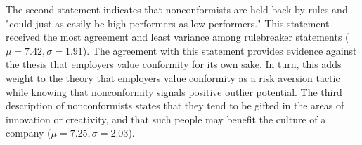 \documentclass[review]{elsarticle}
\begin{document}
The second statement indicates that nonconformists are held back by rules and "could just as easily be high performers as low performers."
This statement received the most agreement and least variance among rulebreaker statements ($\mu = 7.42, \sigma = 1.91$).
The agreement with this statement provides evidence against the thesis that employers value conformity for its own sake.
In turn, this adds weight to the theory that employers value conformity as a risk aversion tactic while knowing that nonconformity signals positive outlier potential.
The third description of nonconformists states that they tend to be gifted in the areas of innovation or creativity,
and that such people may benefit the culture of a company ($\mu = 7.25, \sigma = 2.03$).

\end{document}
